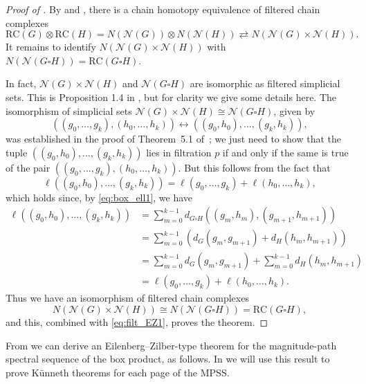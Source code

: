 \documentclass[a4paper, 11 pt, oneside, reqno]{amsart}
\numberwithin{lemma}{section}
\theoremstyle{definition}
\newcommand{\Nv}{\mathcal{N}}
\newcommand{\RC}{\mathrm{RC}}
\begin{document}
\begin{proof}[Proof of ]
    By  and , there is a chain homotopy equivalence of filtered chain complexes
    \begin{equation}
    \label{eq:filt_EZ1}
        \RC(G) \otimes \RC(H) = N(\Nv(G))\otimes N(\Nv(H))\rightleftarrows N(\Nv(G)\times\Nv(H)).
    \end{equation}
    It remains to identify $N(\Nv(G)\times\Nv(H))$
    with $N(\Nv(G\square H)) = \RC(G \square H)$.
    
    In fact, \(\Nv(G)\times\Nv(H)\) and \(\Nv(G\square H)\) are isomorphic as filtered simplicial sets. This is Proposition 1.4 in \cite{DIMZ}, but for clarity we give some details here. The isomorphism of simplicial sets
    $\Nv(G)\times\Nv(H) \cong \Nv(G\square H)$,
    given by
    \[((g_0,\ldots,g_k),(h_0,\ldots,h_k))
    \leftrightarrow ((g_0,h_0),\ldots,(g_k,h_k)),\]
    was established in the proof of Theorem~5.1
    of~\cite{HepworthRoff2023};
    we just need to show that the tuple
    $((g_0,h_0),\ldots,(g_k,h_k))$
    lies in filtration $p$ if and only if
    the same is true of the pair 
    $((g_0,\ldots,g_k),(h_0,\ldots,h_k))$.
    But this follows from the fact that
    \[
        \ell((g_0,h_0),\ldots,(g_k,h_k))
        =
        \ell(g_0,\ldots,g_k)+\ell(h_0,\ldots,h_k),
    \]
    which holds since, by \eqref{eq:box_ell1}, we have
    \begin{align*}
        \ell\left(
            (g_0, h_0), \ldots, (g_k, h_k) 
        \right) 
        &= 
        \sum_{m=0}^{k-1} 
        d_{G \square H} 
        ((g_m,h_m),(g_{m+1},h_{m+1})) 
        \\
        & = 
        \sum_{m=0}^{k-1} 
        (d_G(g_m, g_{m+1}) 
        + d_H(h_m, h_{m+1})) 
        \\
        &= 
        \sum_{m=0}^{k-1} d_G(g_m, g_{m+1}) 
        + 
        \sum_{m=0}^{k-1} d_H(h_m, h_{m+1}) 
        \\
        &= 
        \ell(g_0, \ldots, g_k) + \ell(h_0, \ldots, h_k).
    \end{align*}
    Thus we have an isomorphism of filtered chain complexes
    \[N(\Nv(G) \times \Nv(H)) \cong N(\Nv(G \square H)) = \RC(G \square H),\]
    and this, combined with \eqref{eq:filt_EZ1}, proves the theorem.
\end{proof}

From  we can derive an Eilenberg--Zilber-type theorem for the magnitude-path spectral sequence of the box product, as follows. In  we will use this result to prove K\"unneth theorems for each page of the MPSS.
\end{document}
